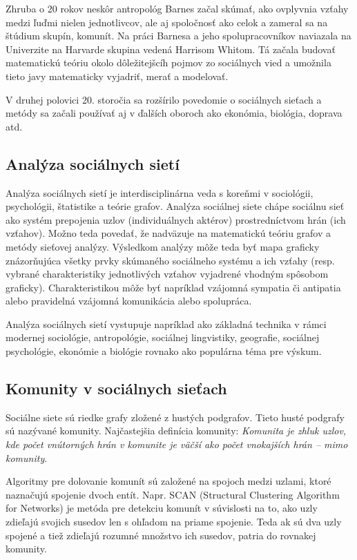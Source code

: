 \documentclass[slovak,master,public,dept460,male,cpdeclaration,oneside]{diploma}
\begin{document}
Zhruba o 20 rokov neskôr antropológ Barnes začal skúmať, ako ovplyvnia vzťahy medzi ľuďmi nielen jednotlivcov, ale aj spoločnosť ako celok a zameral sa na štúdium skupín, komunít. Na práci Barnesa a jeho spolupracovníkov naviazala na Univerzite na Harvarde skupina vedená Harrisom Whitom. Tá začala budovať matematickú teóriu okolo dôležitejšcíh pojmov zo sociálnych vied a umožnila tieto javy matematicky vyjadriť, merať a modelovať.

V druhej polovici 20. storočia sa rozšírilo povedomie o sociálnych sieťach a metódy sa začali používať aj v ďalších oboroch ako ekonómia, biológia, doprava atd.

\subsection{Analýza sociálnych sietí}

Analýza sociálnych sietí je interdisciplinárna veda s koreňmi v sociológii, psychológii,
štatistike a teórie grafov. Analýza sociálnej siete chápe sociálnu sieť ako systém prepojenia uzlov (individuálnych aktérov) prostredníctvom hrán (ich vzťahov). Možno teda povedať, že nadväzuje na matematickú teóriu grafov a metódy sieťovej analýzy. Výsledkom analýzy môže teda byť mapa graficky znázorňujúca všetky prvky skúmaného sociálneho systému a ich vzťahy (resp. vybrané charakteristiky jednotlivých vzťahov vyjadrené vhodným spôsobom graficky). Charakteristikou môže byť napríklad vzájomná sympatia či antipatia alebo pravidelná vzájomná komunikácia alebo spolupráca.


Analýza sociálnych sietí vystupuje napríklad ako základná technika v rámci modernej sociológie,
antropológie, sociálnej lingvistiky, geografie, sociálnej psychológie, ekonómie a biológie
rovnako ako populárna téma pre výskum. 

\subsection{Komunity v sociálnych sieťach}

Sociálne siete sú riedke grafy zložené z hustých podgrafov. Tieto husté podgrafy sú nazývané
komunity. Najčastejšia definícia komunity: \textit{Komunita je zhluk uzlov, kde počet vnútorných hrán v komunite je väčší ako počet vnokajších hrán – mimo komunity}. \cite{8}

Algoritmy pre dolovanie komunít sú založené na spojoch medzi uzlami, ktoré naznačujú
spojenie dvoch entít. Napr. SCAN (Structural Clustering Algorithm for Networks) je metóda
pre detekciu komunít v súvislosti na to, ako uzly zdieľajú svojich susedov len s ohľadom na
priame spojenie. Teda ak sú dva uzly spojené a tiež zdieľajú rozumné množstvo ich susedov,
patria do rovnakej komunity.
\end{document}
